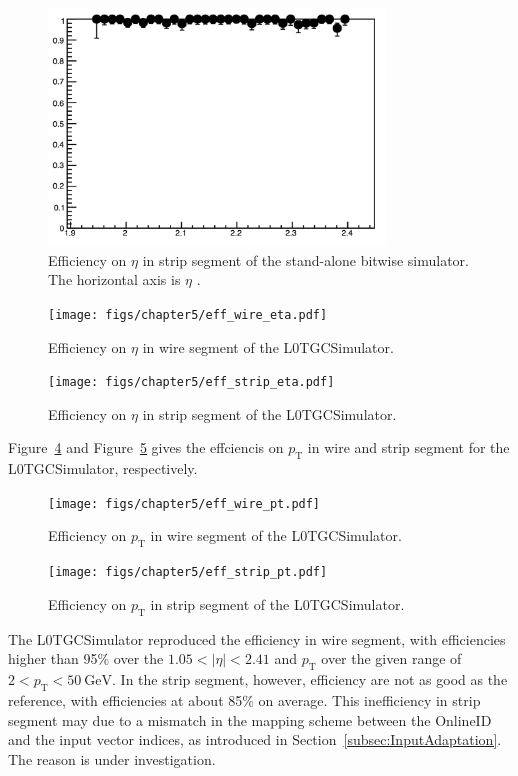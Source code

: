 \begin{figure}[htbp]
  \centering
  \includegraphics[width=0.8\textwidth]{figs/chapter5/yamashita_strip_eff.png}
  \caption{Efficiency on $\eta$ in strip segment of the stand-alone bitwise simulator. The horizontal axis is $\eta$ \cite{yamashita}.}
  \label{fig:yama_strip}
\end{figure}

\begin{figure}[htbp]
  \centering
  \texttt{[image: figs/chapter5/eff\_wire\_eta.pdf]}
  \caption{Efficiency on $\eta$ in wire segment of the L0TGCSimulator.}
  \label{fig:eff_wire_eta}
\end{figure}

\begin{figure}[htbp]
  \centering
  \texttt{[image: figs/chapter5/eff\_strip\_eta.pdf]}
  \caption{Efficiency on $\eta$ in strip segment of the L0TGCSimulator.}
  \label{fig:eff_strip_eta}
\end{figure}

Figure~\ref{fig:eff_wire_pt} and Figure~\ref{fig:eff_strip_pt} gives the effciencis on $p_\mathrm{T}$ in wire and strip segment for the L0TGCSimulator, respectively. 

\begin{figure}[htbp]
  \centering
  \texttt{[image: figs/chapter5/eff\_wire\_pt.pdf]}
  \caption{Efficiency on $p_\mathrm{T}$ in wire segment of the L0TGCSimulator.}
  \label{fig:eff_wire_pt}
\end{figure}

\begin{figure}[htbp]
  \centering
  \texttt{[image: figs/chapter5/eff\_strip\_pt.pdf]}
  \caption{Efficiency on $p_\mathrm{T}$ in strip segment of the L0TGCSimulator.}
  \label{fig:eff_strip_pt}
\end{figure}

The L0TGCSimulator reproduced the efficiency in wire segment, with efficiencies higher than 95\% over the $1.05 < |\eta| < 2.41$ and $p_\mathrm{T}$ over the given range of $2 < p_\mathrm{T} < 50~\text{GeV}$. In the strip segment, however, efficiency are not as good as the reference, with efficiencies at about 85\% on average. This inefficiency in strip segment may due to a mismatch in the mapping scheme between the OnlineID and the input vector indices, as introduced in Section~\ref{subsec:InputAdaptation}. The reason is under investigation.